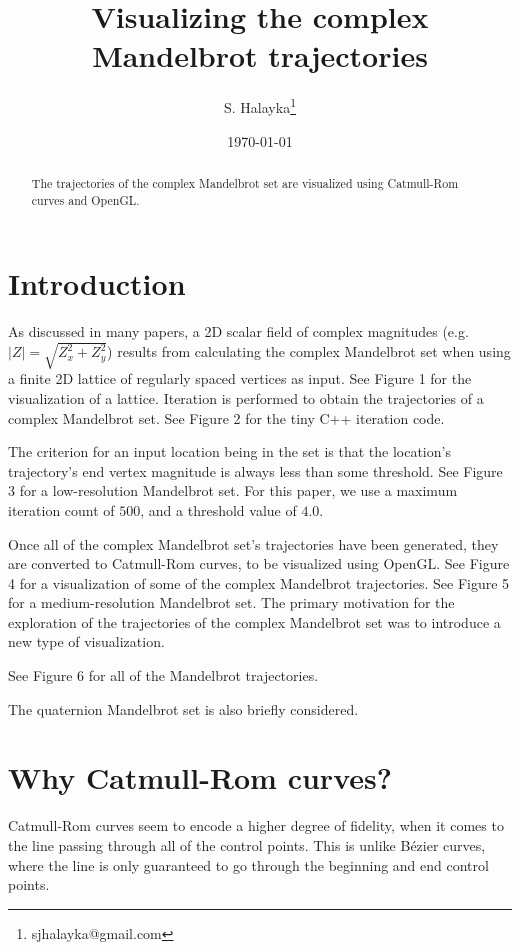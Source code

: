 \documentclass[12pt]{article}
\title{Visualizing the complex Mandelbrot trajectories}
\author{S. Halayka\footnote{sjhalayka@gmail.com}}
\date{\today}
\begin{document}
\maketitle

\begin{abstract}
The trajectories of the complex Mandelbrot set are visualized using Catmull-Rom curves and OpenGL.
\end{abstract}



\section{Introduction}

As discussed in many papers, a 2D scalar field of complex magnitudes (e.g. $|Z| = \sqrt{Z_x^2 + Z_y^2}$) results from calculating the complex Mandelbrot set when using a finite 2D lattice of regularly spaced vertices as input.
See Figure 1 for the visualization of a lattice.
Iteration is performed to obtain the trajectories of a complex Mandelbrot set.
See Figure 2 for the tiny C++ iteration code.

The criterion for an input location being in the set is that the location's trajectory's end vertex magnitude is always less than some threshold.
See Figure 3 for a low-resolution Mandelbrot set.
For this paper, we use a maximum iteration count of $500$, and a threshold value of $4.0$.

Once all of the complex Mandelbrot set's trajectories have been generated, they are converted to Catmull-Rom curves, to be visualized using OpenGL. 
See Figure 4 for a visualization of some of the complex Mandelbrot trajectories.
See Figure 5 for a medium-resolution Mandelbrot set.
The primary motivation for the exploration of the trajectories of the complex Mandelbrot set was to introduce a new type of visualization.

See Figure 6 for all of the Mandelbrot trajectories.

The quaternion Mandelbrot set is also briefly considered.


\section{Why Catmull-Rom curves?}

Catmull-Rom curves seem to encode a higher degree of fidelity, when it comes to the line passing through all of the control points.
This is unlike B\'ezier curves, where the line is only guaranteed to go through the beginning and end control points.
\end{document}
